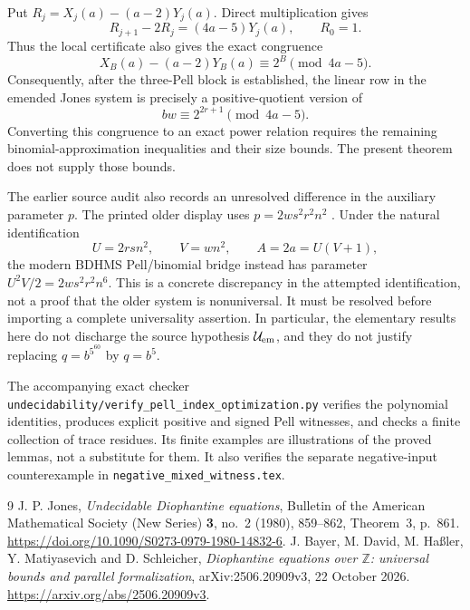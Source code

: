 \documentclass[11pt]{article}
\newcommand{\Z}{\mathbb Z}\newcommand{\N}{\mathbb Z_{\ge0}}
\begin{document}
Put \(R_j=X_j(a)-(a-2)Y_j(a)\).  Direct multiplication gives
\[
 R_{j+1}-2R_j=(4a-5)Y_j(a),\qquad R_0=1.
\]
Thus the local certificate also gives the exact congruence
\[
         X_B(a)-(a-2)Y_B(a)\equiv2^B\pmod {4a-5}.
\]
Consequently, after the three-Pell block is established, the linear
row in the emended Jones system is precisely a positive-quotient
version of
\[
                      bw\equiv2^{2r+1}\pmod {4a-5}.
\]
Converting this congruence to an exact power relation requires the
remaining binomial-approximation inequalities and their size bounds.
The present theorem does not supply those bounds.

The earlier source audit also records an unresolved difference in
the auxiliary parameter \(p\).  The printed older display uses
\(p=2ws^2r^2n^2\) \cite[Theorem 3]{Jones80}.
Under the natural identification
\[
        U=2rsn^2,\qquad V=wn^2,\qquad A=2a=U(V+1),
\]
the modern BDHMS Pell/binomial bridge \cite[Definition 4.1 and
the square condition (4.2b)]{BDHMS} instead has parameter
\(U^2V/2=2ws^2r^2n^6\).  This is a concrete discrepancy in
the attempted identification, not a proof that the older system is
nonuniversal.  It must be resolved before importing a complete
universality assertion.  In particular, the elementary results here
do not discharge the source hypothesis \(\mathcal U_{\rm em}\),
and they do not justify replacing \(q=b^{5^{60}}\) by \(q=b^5\).

The accompanying exact checker
\nolinkurl{undecidability/verify_pell_index_optimization.py}
verifies the polynomial identities, produces explicit positive and
signed Pell witnesses, and checks a finite collection of trace residues.
Its finite examples are illustrations of the proved lemmas, not a
substitute for them.  It also verifies the separate negative-input
counterexample in \texttt{negative\_mixed\_witness.tex}.

\begin{thebibliography}{9}
J. P. Jones, \emph{Undecidable Diophantine equations},
Bulletin of the American Mathematical Society (New Series)
\textbf{3}, no.~2 (1980), 859--862, Theorem~3, p.~861.
\url{https://doi.org/10.1090/S0273-0979-1980-14832-6}.
J. Bayer, M. David, M. Ha{\ss}ler, Y. Matiyasevich and D. Schleicher,
\emph{Diophantine equations over \(\Z\): universal bounds and parallel
formalization}, arXiv:2506.20909v3, 22 October 2026.
\url{https://arxiv.org/abs/2506.20909v3}.
\end{thebibliography}
\end{document}
